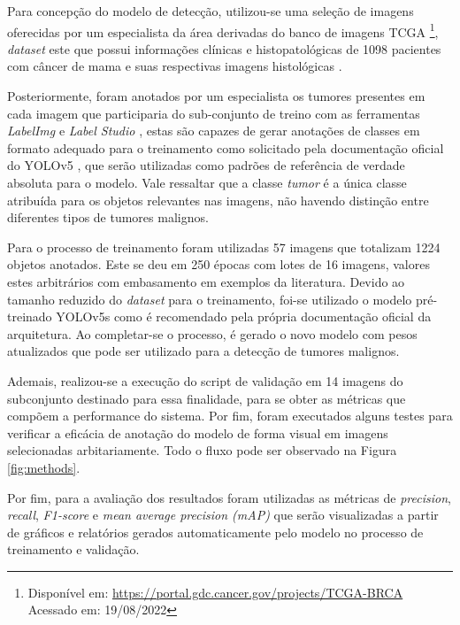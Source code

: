 \documentclass[12pt]{article}
\begin{document}
Para concepção do modelo de detecção, utilizou-se uma seleção de imagens oferecidas por um especialista da área derivadas do banco de imagens TCGA \footnote{Disponível em: \url{https://portal.gdc.cancer.gov/projects/TCGA-BRCA} Acessado em: 19/08/2022 }, {\it dataset} este que possui informações clínicas e histopatológicas de 1098 pacientes com câncer de mama e suas respectivas imagens histológicas \cite{tiezzi2020}.

Posteriormente, foram anotados por um especialista os tumores presentes em cada imagem que participaria do sub-conjunto de treino com as ferramentas {\it LabelImg} \cite{tzutalin2015labelimg} e {\it Label Studio} \cite{labelStudio}, estas são capazes de gerar anotações de classes em formato adequado para o treinamento como solicitado pela documentação oficial do YOLOv5 \cite{glenn_jocher_2022}, que serão utilizadas como padrões de referência de verdade absoluta para o modelo. Vale ressaltar que a classe {\it tumor} é a única classe atribuída para os objetos relevantes nas imagens, não havendo distinção entre diferentes tipos de tumores malignos.

Para o processo de treinamento foram utilizadas 57 imagens que totalizam 1224 objetos anotados. Este se deu em 250 épocas com lotes de 16 imagens, valores estes arbitrários com embasamento em exemplos da literatura. Devido ao tamanho reduzido do {\it dataset} para o treinamento, foi-se utilizado o modelo pré-treinado YOLOv5s \cite{glenn_jocher_2022} como é recomendado pela própria documentação oficial da arquitetura. Ao completar-se o processo, é gerado o novo modelo com pesos atualizados que pode ser utilizado para a detecção de tumores malignos.

Ademais, realizou-se a execução do script de validação em 14 imagens do subconjunto destinado para essa finalidade, para se obter as métricas que compõem a performance do sistema. Por fim, foram executados alguns testes para verificar a eficácia de anotação do modelo de forma visual em imagens selecionadas arbitariamente. Todo o fluxo pode ser observado na Figura \ref{fig:methods}.

Por fim, para a avaliação dos resultados foram utilizadas as métricas de {\it precision}, {\it recall}, {\it F1-score} e {\it mean average precision (mAP)} que serão visualizadas a partir de gráficos e relatórios gerados automaticamente pelo modelo no processo de treinamento e validação.
\end{document}
